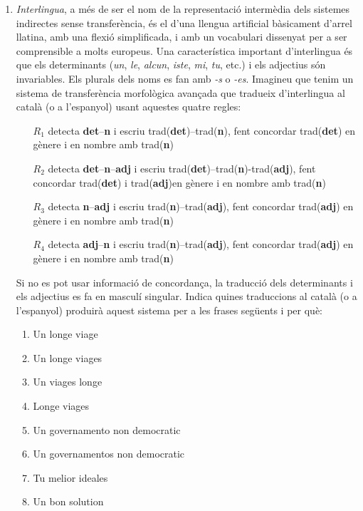 \begin{enumerate}
\item \emph{Interlingua}, a més de ser el nom de la representació
  intermèdia dels sistemes indirectes sense transferència, és el d'una
  llengua artificial bàsicament d'arrel llatina, amb una flexió
  simplificada, i amb un vocabulari dissenyat per a ser comprensible a
  molts europeus.  Una característica important d'interlingua és que
  els determinants (\emph{un}, \emph{le}, \emph{alcun}, \emph{iste},
  \emph{mi}, \emph{tu}, etc.) i els adjectius són invariables. Els
  plurals dels noms es fan amb \emph{-s} o \emph{-es}.  Imagineu que
  tenim un sistema de transferència morfològica avançada que tradueix
  d'interlingua al català (o a l'espanyol) usant aquestes quatre
  regles:
  \begin{itemize}
  \item[$R_1$] detecta \textbf{det}--\textbf{n} i escriu
    \textsf{trad}(\textbf{det})--\textsf{trad}(\textbf{n}), fent
    concordar \textsf{trad}(\textbf{det}) en gènere i en nombre amb
    \textsf{trad}(\textbf{n})
  \item[$R_2$] detecta \textbf{det}--\textbf{n}--\textbf{adj} i escriu
    \textsf{trad}(\textbf{det})--\textsf{trad}(\textbf{n})-\textsf{trad}(\textbf{adj}),
    fent concordar \textsf{trad}(\textbf{det}) i
    \textsf{trad}(\textbf{adj})en gènere i en nombre amb
    \textsf{trad}(\textbf{n})
  \item[$R_3$] detecta \textbf{n}--\textbf{adj} i escriu
    \textsf{trad}(\textbf{n})--\textsf{trad}(\textbf{adj}), fent
    concordar \textsf{trad}(\textbf{adj}) en gènere i en nombre amb
    \textsf{trad}(\textbf{n})
  \item[$R_4$] detecta \textbf{adj}--\textbf{n} i escriu
    \textsf{trad}(\textbf{n})--\textsf{trad}(\textbf{adj}), fent
    concordar \textsf{trad}(\textbf{adj}) en gènere i en nombre amb
    \textsf{trad}(\textbf{n})
  \end{itemize}
  Si no es pot usar informació de concordança, la traducció dels
  determinants i els adjectius es fa en masculí singular.  Indica
  quines traduccions al català (o a l'espanyol) produirà aquest
  sistema per a les frases següents i per què:
  \begin{enumerate}
  \item \textsf{Un longe viage}
  \item \textsf{Un longe viages}
  \item \textsf{Un viages longe}
  \item \textsf{Longe viages}
  \item \textsf{Un governamento non democratic}
  \item \textsf{Un governamentos non democratic}
  \item \textsf{Tu melior ideales}
  \item \textsf{Un bon solution}
  \end{enumerate}


\end{enumerate}
